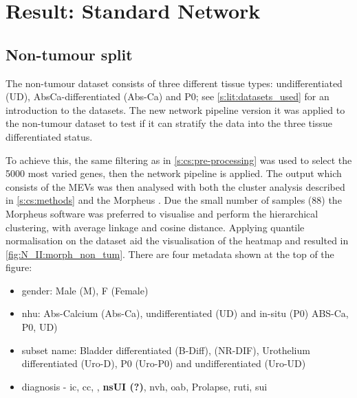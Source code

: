 \section{Result: Standard Network}  \label{s:N_II:std_net}

\vspace{3mm}
\vspace{3mm}

\subsection{Non-tumour split} \label{s:N_II:std}

The non-tumour dataset consists of three different tissue types: undifferentiated (UD), AbsCa-differentiated (Abs-Ca) and P0; see \cref{s:lit:datasets_used} for an introduction to the datasets. The new network pipeline version it was applied to the non-tumour dataset to test if it can stratify the data into the three tissue differentiated status.

To achieve this, the same filtering as in \cref{s:cs:pre-processing} was used to select the 5000 most varied genes, then the network pipeline is applied. The output which consists of the MEVs was then analysed with both the cluster analysis described in \cref{s:cs:methods} and the Morpheus \cite{Broad-InstituteUnknown-kn}. Due the small number of samples (88) the Morpheus software was preferred to visualise and perform the hierarchical clustering, with average linkage and cosine distance. Applying quantile normalisation on the dataset aid the visualisation of the heatmap and resulted in \cref{fig:N_II:morph_non_tum}. There are four metadata shown at the top of the figure: 
\begin{itemize}
    \item gender: Male (M), F (Female)
    \item \acrfull{nhu}: Abs-Calcium (Abs-Ca), undifferentiated (UD) and in-situ (P0)
    ABS-Ca, P0, UD)
    \item subset name: Bladder differentiated (B-Diff), (NR-DIF), Urothelium differentiated (Uro-D), P0 (Uro-P0) and undifferentiated (Uro-UD)
    \item diagnosis - \acrfull{ic}, \acrfull{cc},  , \textbf{nsUI (?)},  \acrfull{nvh}, \acrfull{oab}, Prolapse, \acrfull{ruti}, \acrfull{sui}
\end{itemize} 

